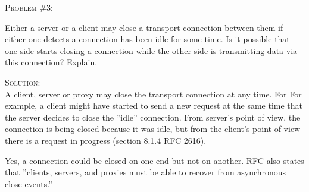 \documentclass[12pt]{article}
\newenvironment{problem}[1]
{\begin{mdframed}[linewidth=0.8pt]
        \textsc{Problem #1:}

}
    {\end{mdframed}}
\newenvironment{solution}
    {\textsc{Solution:}\\}
    {\newpage}%
\begin{document}
	\begin{problem}{\#3}
		Either a server or a client may close a transport connection between them if
		either one detects a connection has been idle for some time. Is it possible
		that one side starts closing a connection while the other side is transmitting
		data via this connection? Explain.
	\end{problem}
	\begin{solution}
		A client, server or proxy may close the transport connection at any time. For
		For example, a client might have started to send a new request at the same time
		that the server decides to close the ''idle'' connection. From server's point of
		view, the connection is being closed because it was idle, but from the client's
		point of view there is a request in progress (section 8.1.4 RFC 2616).

		Yes, a connection could be closed on one end but not on another. RFC also states
		that ''clients, servers, and proxies must be able to recover from asynchronous
		close events.''
	\end{solution}
\end{document}
